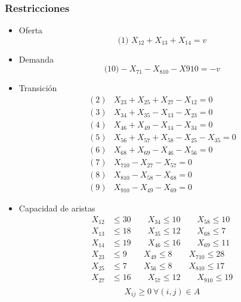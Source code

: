 \documentclass[a4paper,12pt]{article}
\begin{document}
\subsubsection{Restricciones}
\begin{itemize}
	\item Oferta
		\begin{equation*}
		\text{(1) }	X_{12}+X_{13}+X_{14}=v	
		\end{equation*}
	\item Demanda
		\begin{equation*}
		\text{(10)}	-X_{71}-X_{810}-X{910}=-v
		\end{equation*}
	\item Transición
		\begin{equation*}
		\begin{split}
			(2)&X_{23}+X_{25}+X_{27}-X_{12}=0\\
			(3)&X_{34}+X_{35}-X_{13}-X_{23}=0\\
			(4)&X_{46}+X_{49}-X_{14}-X_{34}=0\\
			(5)&X_{56}+X_{57}+X_{58}-X_{25}-X_{35}=0\\
			(6)&X_{68}+X_{69}-X_{46}-X_{56}=0\\
			(7)&X_{710}-X_{27}-X_{57}=0\\
			(8)&X_{810}-X_{58}-X_{68}=0\\
			(9)&X_{910}-X_{49}-X_{69}=0
		\end{split}
		\end{equation*}
		\item Capacidad de aristas
		\begin{equation*}
		\begin{split}
			X_{12}&\leq 30 \qquad X_{34}\leq 10 \qquad X_{58}\leq 10\\
			X_{13}&\leq 18 \qquad X_{35}\leq 12 \qquad X_{68}\leq 7\\
			X_{14}&\leq 19 \qquad X_{46}\leq 16 \qquad X_{69}\leq 11\\
			X_{23}&\leq 9 \qquad X_{49}\leq 8 \qquad X_{710}\leq 28\\
			X_{25}&\leq 7 \qquad X_{56}\leq 8 \qquad X_{810}\leq 17\\
			X_{27}&\leq 16 \qquad X_{57}\leq 12 \qquad X_{910}\leq 19\\
		\end{split}
		\end{equation*}
		\begin{equation*}
			X_{ij}\geq 0\ \forall(i,j)\in A
		\end{equation*}
\end{itemize}
\end{document}
